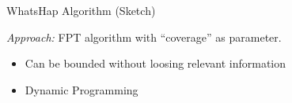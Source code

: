 \documentclass[notes=hide]{beamer}
\begin{document}
%		
%


\begin{frame}{WhatsHap Algorithm (Sketch)}
\begin{block}{}
\emph{Approach:} FPT algorithm with ``coverage'' as parameter.
\begin{itemize}
 \item Can be bounded without loosing relevant information
 \item Dynamic Programming
\end{itemize}
\end{block}
\end{frame}
\end{document}
